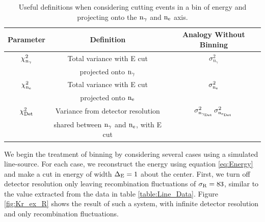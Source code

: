 \renewcommand{\baselinestretch}{1}
\small\normalsize
\begin{table}[h!]
\begin{center}
\begin{tabular}{|c|c|c|}
\hline
Parameter & Definition & Analogy Without Binning
 \\ \hline
$\rm \chi_{n_{\gamma}}^2$	& Total variance with E cut	& $\sigma_{n_{\gamma}}^2$ \\ 
							& projected onto $\rm n_\gamma$ & 						\\ \hline					
$\rm \chi_{n_{e}}^2$ & Total variance with E cut	& $\rm \sigma_{n_{e}}^2$	\\
							& projected onto $\rm n_e$ & 						\\ \hline
$\rm \chi_{Det}^2$			& Variance from detector resolution & $\rm \sigma_{n_{\gamma_{Det}}}^2 \, \sigma_{n_{e_{Det}}}^2 $ \\
							& shared between $\rm n_\gamma$ and $\rm n_e$, with E cut   & 						\\ \hline
\end{tabular}
\caption{ Useful definitions when considering cutting events in a bin of energy and projecting onto the $\rm n_\gamma$ and $\rm n_e$ axis. }
\label{table:E_Slice}
\end{center}
\end{table}
\renewcommand{\baselinestretch}{2}
\small\normalsize
 
 \newpage

We begin the treatment of binning by considering several cases using a simulated \KrCal line-source. For each case, we reconstruct the energy using equation \ref {eq:Energy} and make a cut in energy of width $\rm \Delta_E=1$ about the center. First, we turn off detector resolution only leaving recombination fluctuations of $\rm \sigma_R = 83 $, similar to the value extracted from the \KrCal data in table \ref{table:Line_Data}. Figure \ref{fig:Kr_ex_R} shows the result of such a system, with infinite detector resolution and only recombination fluctuations.

